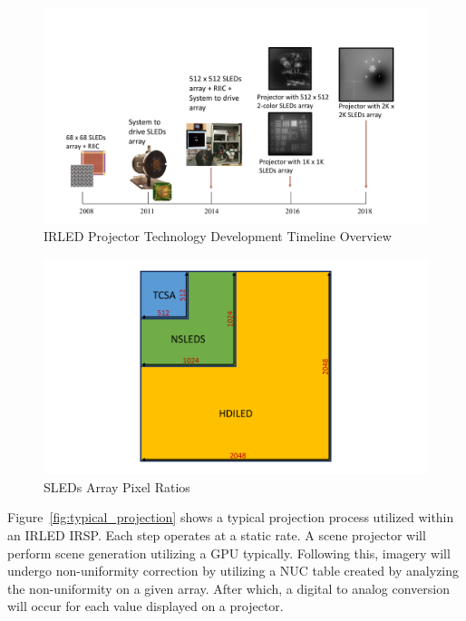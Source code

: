     \begin{figure}
        \centering
        \includegraphics[trim=0.5in 0.5in 0.5in 1.5in,width=1.0\textwidth]{fig/sleds_timeline.pdf}
        \caption{IRLED Projector Technology Development Timeline Overview}
        \label{fig:sleds_timeline}
    \end{figure}

    \begin{figure}
        \centering
        \includegraphics[trim=0.5in 0.5in 0.5in 1.5in,width=1.0\textwidth]{fig/tcsa_nsleds_hdiled_array_ratio.pdf}
        \caption{SLEDs Array Pixel Ratios}
        \label{fig:tcsa_nsleds_hdiled_array_ratio}
    \end{figure}


    Figure~\ref{fig:typical_projection} shows a typical projection process utilized within an IRLED IRSP. Each step operates at a static rate. A scene projector will perform scene generation utilizing a GPU typically. Following this, imagery will undergo non-uniformity correction by utilizing a NUC table created by analyzing the non-uniformity on a given array. After which, a digital to analog conversion will occur for each value displayed on a projector.

